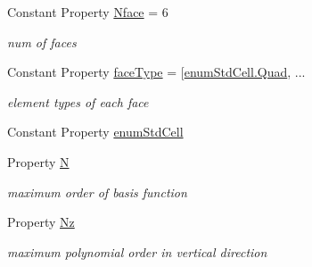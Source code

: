 \begin{DoxyCompactItemize}
Constant Property \hyperlink{class_std_prism_quad_a23013d23167a295bc51d09a12bfc3303}{Nface} = 6
\begin{DoxyCompactList}\small\item\em num of faces \end{DoxyCompactList}\item 
Constant Property \hyperlink{class_std_prism_quad_a8897f0a9708b5b2162e6d82d8819ea6e}{face\+Type} = \mbox{[}\hyperlink{classenum_std_cell_ac4c2fa4e189e76e103f3ff9b1d19b9e7a79d1c44e78bdfebfd755a724f5e04029}{enum\+Std\+Cell.\+Quad}, ...
\begin{DoxyCompactList}\small\item\em element types of each face \end{DoxyCompactList}\item 
Constant Property \hyperlink{class_std_prism_quad_a8e6acdd1d42d543a6224ed6e58168bd3}{enum\+Std\+Cell}
\item 
Property \hyperlink{class_std_prism_quad_a102875849698a7af9c9599f48b48104d}{N}
\begin{DoxyCompactList}\small\item\em maximum order of basis function \end{DoxyCompactList}\item 
Property \hyperlink{class_std_prism_quad_a62d7fa646d7c8cb0cfbebbb0b3cde473}{Nz}
\begin{DoxyCompactList}\small\item\em maximum polynomial order in vertical direction \end{DoxyCompactList}\end{DoxyCompactItemize}
